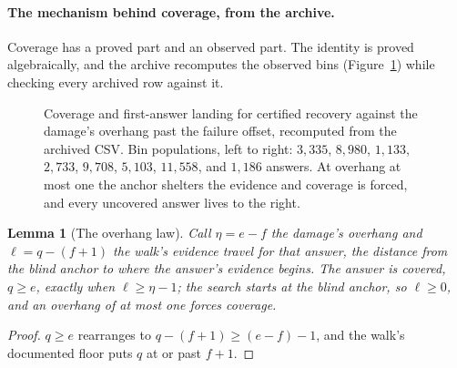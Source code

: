 \documentclass[11pt,a4paper]{article}
\theoremstyle{definition}
\theoremstyle{plain}
\newtheorem{lemma}{Lemma}
\theoremstyle{remark}
\begin{document}
\paragraph{The mechanism behind coverage, from the archive.} Coverage has a proved part and an observed part. The
identity is proved algebraically, and the archive recomputes the observed bins (Figure~\ref{fig:overhang}) while
checking every archived row against it.

\begin{figure}[!htb]
\centering
{}
\caption{Coverage and first-answer landing for certified recovery against the damage's overhang past the failure offset,
recomputed from the archived CSV. Bin populations, left to right: $3{,}335$, $8{,}980$, $1{,}133$, $2{,}733$, $9{,}708$,
$5{,}103$, $11{,}558$, and $1{,}186$ answers. At overhang at most one the anchor shelters the evidence and coverage is
forced, and every uncovered answer lives to the right.}
\label{fig:overhang}
\end{figure}

\begin{lemma}[The overhang law]
\label{lem:overhang}
Call $\eta = e - f$ the damage's \emph{overhang} and $\ell = q - (f{+}1)$ the walk's \emph{evidence travel} for that
answer, the distance from the blind anchor to where the answer's evidence begins. The answer is covered, $q \ge e$,
exactly when $\ell \ge \eta - 1$; the search starts at the blind anchor, so $\ell \ge 0$, and an overhang of at most one
forces coverage.
\end{lemma}

\begin{proof}
$q \ge e$ rearranges to $q - (f{+}1) \ge (e - f) - 1$, and the walk's documented floor puts $q$ at or past $f{+}1$.
\end{proof}
\end{document}
